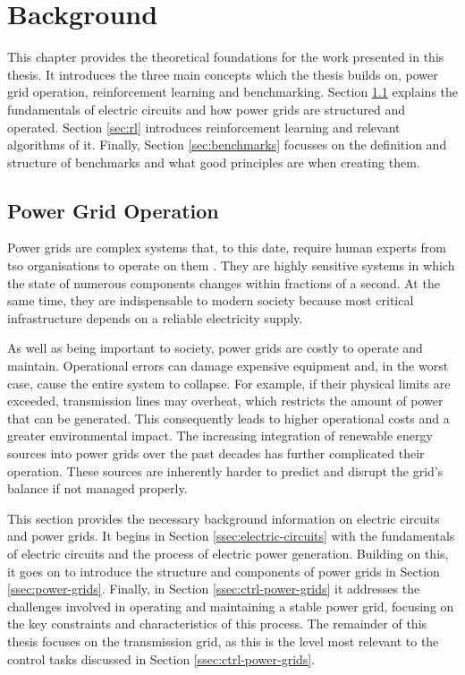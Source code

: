 \chapter{Background}\label{ch:background}
This chapter provides the theoretical foundations for the work presented in this thesis. It introduces the three main concepts which the thesis builds on, power grid operation, reinforcement learning and benchmarking. Section \ref{sec:power_grid_op} explains the fundamentals of electric circuits and how power grids are structured and operated. Section \ref{sec:rl} introduces reinforcement learning and relevant algorithms of it. Finally, Section \ref{sec:benchmarks} focusses on the definition and structure of benchmarks and what good principles are when creating them.



\section{Power Grid Operation}\label{sec:power_grid_op}
Power grids are complex systems that, to this date, require human experts from \ac{tso} organisations to operate on them \cite{pptopogym}. They are highly sensitive systems in which the state of numerous components changes within fractions of a second. At the same time, they are indispensable to modern society because most critical infrastructure depends on a reliable electricity supply.

As well as being important to society, power grids are costly to operate and maintain. Operational errors can damage expensive equipment and, in the worst case, cause the entire system to collapse. For example, if their physical limits are exceeded, transmission lines may overheat, which restricts the amount of power that can be generated. This consequently leads to higher operational costs and a greater environmental impact. The increasing integration of renewable energy sources into power grids over the past decades \cite{us_epa_power_2022} has further complicated their operation. These sources are inherently harder to predict and disrupt the grid's balance if not managed properly.

This section provides the necessary background information on electric circuits and power grids. It begins in Section \ref{ssec:electric-circuits} with the fundamentals of electric circuits and the process of electric power generation. Building on this, it goes on to introduce the structure and components of power grids in Section \ref{ssec:power-grids}. Finally, in Section \ref{ssec:ctrl-power-grids} it addresses the challenges involved in operating and maintaining a stable power grid, focusing on the key constraints and characteristics of this process. The remainder of this thesis focuses on the transmission grid, as this is the level most relevant to the control tasks discussed in Section \ref{ssec:ctrl-power-grids}.


